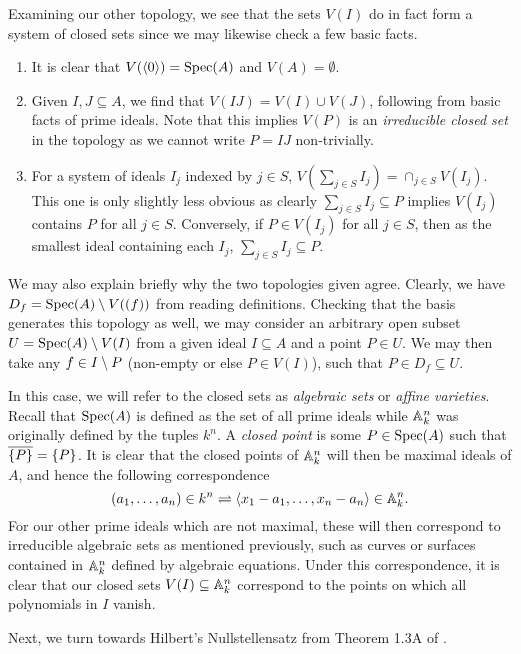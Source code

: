 Examining our other topology, we see that the sets $V(I)$ do in fact form a system of closed sets since we may likewise check a few basic facts.
\begin{enumerate}
    \item It is clear that $V(\langle 0 \rangle) = {\rm Spec}(A)$ and $V(A) = \emptyset$.
    \item Given $I, J \subseteq A$, we find that $V(IJ) = V(I) \cup V(J)$, following from basic facts of prime ideals.
    Note that this implies $V(P)$ is an \textit{irreducible closed set} in the topology as we cannot write $P = IJ$ non-trivially.
    \item For a system of ideals $I_j$ indexed by $j \in S$, $V( \sum_{j \in S} I_j ) = \cap_{j \in S} V(I_j).$
    This one is only slightly less obvious as clearly $\sum_{j \in S} I_j \subseteq P$ implies $V(I_j)$ contains $P$ for all $j \in S$.
    Conversely, if $P \in V(I_j)$ for all $j \in S$, 
    then as the smallest ideal containing each $I_j$, $\sum_{j \in S} I_j \subseteq P$.
\end{enumerate}

We may also explain briefly why the two topologies given agree.
Clearly, we have $D_f = {\rm Spec}(A) \setminus V((f))$ from reading definitions.
Checking that the basis generates this topology as well, 
we may consider an arbitrary open subset $U = {\rm Spec}(A) \setminus V(I)$ from a given ideal $I \subseteq A$ and a point $P \in U$. 
We may then take any $f \in I \setminus P$ (non-empty or else $P \in V(I)$), such that $P \in D_f \subseteq U$.

In this case, we will refer to the closed sets as \textit{algebraic sets} or \textit{affine varieties}.
Recall that ${\rm Spec}(A)$ is defined as the set of all prime ideals while $\mathbb{A}_k^n$ was originally defined by the tuples $k^n$.
A \textit{closed point} is some $P \in {\rm Spec}(A)$ such that $\overline{\{P\}} = \{P\}$.
It is clear that the closed points of $\mathbb{A}_k^n$ will then be maximal ideals of $A$, and hence the following correspondence
\[
    (a_1, \ldots, a_n) \in k^n \rightleftharpoons \langle x_1 - a_1, \ldots, x_n - a_n \rangle \in \mathbb{A}_k^n.
\]
For our other prime ideals which are not maximal, these will then correspond to irreducible algebraic sets as mentioned previously, 
such as curves or surfaces contained in $\mathbb{A}_k^n$ defined by algebraic equations.
Under this correspondence, it is clear that our closed sets $V(I) \subseteq \mathbb{A}^n_k$ correspond to the points on which all polynomials in $I$ vanish.

Next, we turn towards Hilbert's Nullstellensatz from Theorem 1.3A of \cite{Hartshorne_2013}. 

